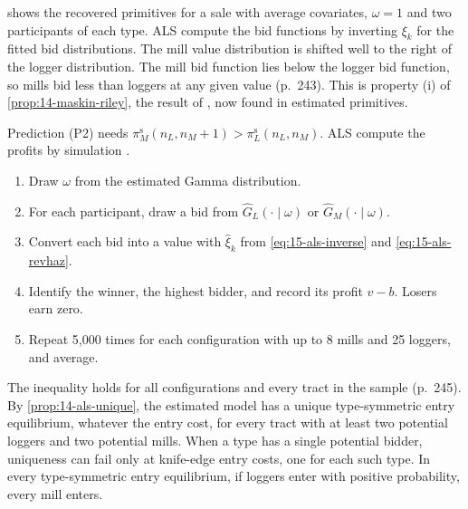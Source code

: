  shows the recovered primitives for a sale with average covariates, $\omega=1$ and
two participants of each type. ALS compute the bid functions by inverting $\xi_k$ for the fitted bid
distributions. The mill value distribution is shifted well to the right of the logger distribution. The
mill bid function lies below the logger bid function, so mills bid less than loggers at any given value
(p.~243). This is property (i) of \cref{prop:14-maskin-riley}, the result of \citet{MaskinRiley2000}, now
found in estimated primitives.

Prediction (P2) needs $\pi^{\mathrm s}_M(n_L,n_M+1)>\pi^{\mathrm s}_L(n_L,n_M)$. ALS compute the profits by
simulation \citep[pp.~243--245]{AtheyLevinSeira2011}.
\begin{enumerate}[label=(\arabic*)]
\item Draw $\omega$ from the estimated Gamma distribution.
\item For each participant, draw a bid from $\hat G_L(\cdot\mid\omega)$ or $\hat G_M(\cdot\mid\omega)$.
\item Convert each bid into a value with $\hat\xi_k$ from \eqref{eq:15-als-inverse} and \eqref{eq:15-als-revhaz}.
\item Identify the winner, the highest bidder, and record its profit $v-b$. Losers earn zero.
\item Repeat 5,000 times for each configuration with up to 8 mills and 25 loggers, and average.
\end{enumerate}
The inequality holds for all configurations and every tract in the sample (p.~245). By
\cref{prop:14-als-unique}, the estimated model has a unique type-symmetric entry equilibrium, whatever the entry cost,
for every tract with at least two potential loggers and two potential mills. When a type has a single potential bidder,
uniqueness can fail only at knife-edge entry costs, one for each such type. In every type-symmetric entry equilibrium, if loggers enter with positive probability, every mill
enters.

